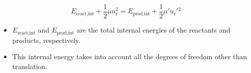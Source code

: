 \documentclass[../notes.tex]{subfiles}
\begin{document}
\begin{itemize}
\begin{itemize}
        \begin{equation*}
            E_\text{react,int}+\frac{1}{2}\mu u_\text{r}^2 = E_\text{prod,int}+\frac{1}{2}\mu'u_\text{r}'{}^2
        \end{equation*}
        \begin{itemize}
            \item $E_\text{react,int}$ and $E_\text{prod,int}$ are the total internal energies of the reactants and products, respectively.
            \item This internal energy takes into account all the degrees of freedom other than translation.
        \end{itemize}
    \end{itemize}
\end{itemize}
\end{document}
